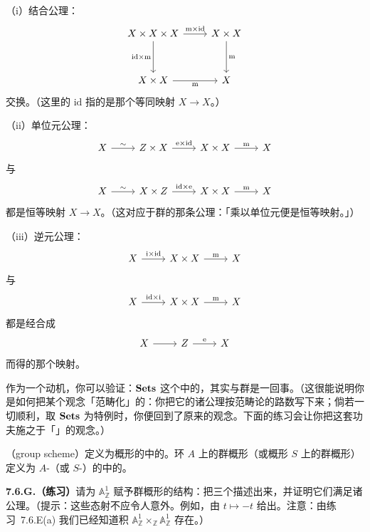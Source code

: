 （i）结合公理：
\[
\begin{tikzcd}[row sep=3.2em]
X\times X\times X \ar[r, "\mathrm{m}\times\mathrm{id}"] \ar[d, "\mathrm{id}\times\mathrm{m}"'] & X\times X \ar[d, "\mathrm{m}"] \\
X\times X \ar[r, "\mathrm{m}"'] & X
\end{tikzcd}
\]
交换。（这里的 $\mathrm{id}$ 指的是那个等同映射 $X\to X$。）

（ii）单位元公理：
\[
\begin{tikzcd}
X \ar[r, "\sim"] & Z\times X \ar[r, "\mathrm{e}\times\mathrm{id}"] & X\times X \ar[r, "\mathrm{m}"] & X
\end{tikzcd}
\]
与
\[
\begin{tikzcd}
X \ar[r, "\sim"] & X\times Z \ar[r, "\mathrm{id}\times\mathrm{e}"] & X\times X \ar[r, "\mathrm{m}"] & X
\end{tikzcd}
\]
都是恒等映射 $X\to X$。（这对应于群的那条公理：「乘以单位元便是恒等映射。」）

（iii）逆元公理：
\[
\begin{tikzcd}
X \ar[r, "\mathrm{i}\times\mathrm{id}"] & X\times X \ar[r, "\mathrm{m}"] & X
\end{tikzcd}
\]
与
\[
\begin{tikzcd}
X \ar[r, "\mathrm{id}\times\mathrm{i}"] & X\times X \ar[r, "\mathrm{m}"] & X
\end{tikzcd}
\]
都是经合成
\[
\begin{tikzcd}
X \ar[r] & Z \ar[r, "\mathrm{e}"] & X
\end{tikzcd}
\]
而得的那个映射。

作为一个动机，你可以验证：$\mathbf{Sets}$ 这个\trCategory{}中的\trGroupObject{}，其实与群是一回事。（这很能说明你是如何把某个观念「范畴化」的：你把它的诸公理按范畴论的路数写下来；倘若一切顺利，取 $\mathbf{Sets}$ 为特例时，你便回到了原来的观念。下面的练习会让你把这套功夫施之于「\trRing」的观念。）

\textbf{\trGroupScheme}（group scheme）定义为概形的\trCategory{}中的\trGroupObject{}。环 $A$ 上的群概形（或概形 $S$ 上的群概形）定义为 $A$-\trScheme（或 $S$-\trScheme）的\trCategory{}中的\trGroupObject{}。

\textbf{7.6.G.（练习）}\quad 请为 $\mathbb{A}^1_{\mathbb{Z}}$ 赋予群概形的结构：把三个\trStructureMorphism{}描述出来，并证明它们满足诸公理。（提示：这些态射不应令人意外。例如，\trInverseElement{}由 $t\mapsto-t$ 给出。注意：由\mbox{练习~7.6.E}(a) 我们已经知道积 $\mathbb{A}^1_{\mathbb{Z}}\times_{\mathbb{Z}}\mathbb{A}^1_{\mathbb{Z}}$ 存在。）

